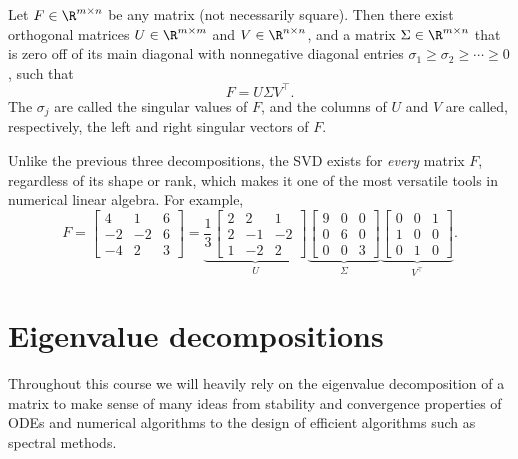 \begin{definition}
    Let $F \in \R^{m \times n}$ be any matrix (not necessarily square). Then there exist orthogonal matrices $U \in \R^{m \times m}$ and $V \in \R^{n \times n}$, and a matrix $\Sigma \in \R^{m \times n}$ that is zero off of its main diagonal with nonnegative diagonal entries $\sigma_1 \ge \sigma_2 \ge \cdots \ge 0$, such that
    \begin{equation*}
        F = U \Sigma V^\top.
    \end{equation*}
    The $\sigma_j$ are called the singular values of $F$, and the columns of $U$ and $V$ are called, respectively, the left and right singular vectors of $F$.
\end{definition}
Unlike the previous three decompositions, the SVD exists for \emph{every} matrix $F$, regardless of its shape or rank, which makes it one of the most versatile tools in numerical linear algebra. For example,
\begin{equation*}
    F = \begin{bmatrix}
        4 & 1 & 6 \\
        -2 & -2 & 6 \\
        -4 & 2 & 3
    \end{bmatrix}
    =
    \underbrace{\frac{1}{3}\begin{bmatrix}
        2 & 2 & 1 \\
        2 & -1 & -2 \\
        1 & -2 & 2
    \end{bmatrix}}_{U}
    \underbrace{\begin{bmatrix}
        9 & 0 & 0 \\
        0 & 6 & 0 \\
        0 & 0 & 3
    \end{bmatrix}}_{\Sigma}
    \underbrace{\begin{bmatrix}
        0 & 0 & 1 \\
        1 & 0 & 0 \\
        0 & 1 & 0
    \end{bmatrix}}_{V^\top}.
\end{equation*}


\section{Eigenvalue decompositions}

Throughout this course we will heavily rely on the eigenvalue decomposition of 
a matrix to make sense of many ideas from stability and convergence 
properties of ODEs and numerical algorithms to the design of 
efficient algorithms such as spectral methods. 

